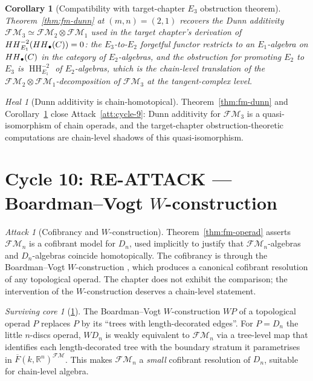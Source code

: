 \documentclass[11pt]{article}
\newtheorem{corollary}[theorem]{Corollary}
\theoremstyle{definition}
\theoremstyle{remark}
\newtheorem{attack}[theorem]{Attack}
\newtheorem{heal}[theorem]{Heal}
\newtheorem{survivor}[theorem]{Surviving core}
\DeclareMathOperator{\HH}{HH}
\newcommand{\FMbar}{\overline{F}}
\newcommand{\FM}{\mathcal{FM}}
\newcommand{\Ddisk}{D}
\newcommand{\Eone}{E_1}
\newcommand{\Etwo}{E_2}
\begin{document}
\begin{corollary}[Compatibility with target-chapter $E_3$ obstruction theorem]
\label{cor:compat-e3-obstr}
Theorem~\ref{thm:fm-dunn} at $(m, n) = (2, 1)$ recovers the Dunn
additivity $\FM_3 \simeq \FM_2 \otimes \FM_1$ used in the target
chapter's derivation of
$\HH^{-2}_{E_1}(\HH_\bullet(\cC)) = 0$: the $E_3$-to-$\Etwo$
forgetful functor restricts to an $\Eone$-algebra on
$\HH_\bullet(\cC)$ in the category of $\Etwo$-algebras, and the
obstruction for promoting $\Etwo$ to $E_3$ is $\HH^{-2}_{E_1}$ of
$\Etwo$-algebras, which is the chain-level translation of the
$\FM_2 \otimes \FM_1$-decomposition of $\FM_3$ at the tangent-complex
level.
\end{corollary}

\begin{heal}[Dunn additivity is chain-homotopical]
\label{heal:cycle-9}
Theorem~\ref{thm:fm-dunn} and Corollary~\ref{cor:compat-e3-obstr}
close Attack~\ref{att:cycle-9}: Dunn additivity for $\FM_3$ is a
quasi-isomorphism of chain operads, and the target-chapter
obstruction-theoretic computations are chain-level shadows of this
quasi-isomorphism.
\end{heal}

\section{Cycle 10: RE-ATTACK --- Boardman--Vogt $W$-construction}

\begin{attack}[Cofibrancy and $W$-construction]
\label{att:cycle-10}
Theorem~\ref{thm:fm-operad} asserts $\FM_n$ is a cofibrant model for
$\Ddisk_n$, used implicitly to justify that $\FM_n$-algebras and
$\Ddisk_n$-algebras coincide homotopically. The cofibrancy is
through the Boardman--Vogt $W$-construction
\cite{BoardmanVogt1973, BergerMoerdijk2006}, which produces a
canonical cofibrant resolution of any topological operad. The
chapter does not exhibit the comparison; the intervention of the
$W$-construction deserves a chain-level statement.
\end{attack}

\begin{survivor}[\ref{att:cycle-10}]
The Boardman--Vogt $W$-construction $W P$ of a topological operad
$P$ replaces $P$ by its ``trees with length-decorated edges''. For
$P = \Ddisk_n$ the little $n$-discs operad, $W \Ddisk_n$ is
weakly equivalent to $\FM_n$ via a tree-level map that identifies
each length-decorated tree with the boundary stratum it parametrises
in $\FMbar(k, \mathbb{R}^n)^{\FM}$. This makes $\FM_n$ a \emph{small}
cofibrant resolution of $\Ddisk_n$, suitable for chain-level algebra.
\end{survivor}
\end{document}
